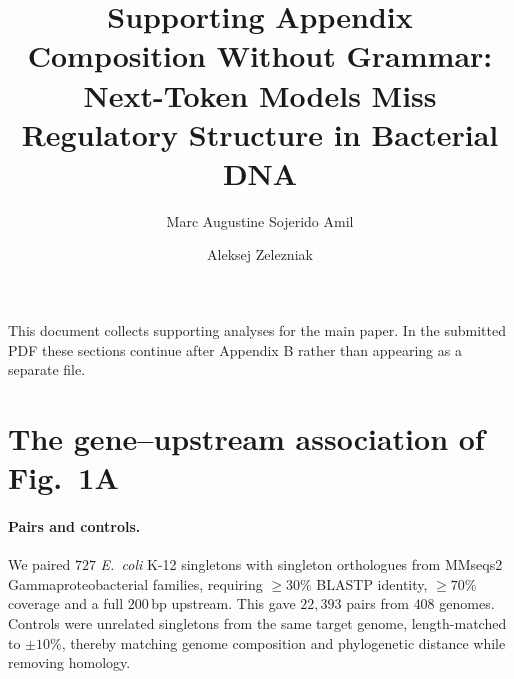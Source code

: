 \documentclass{article}
\title{Supporting Appendix\\[0.4em]
\large Composition Without Grammar: Next-Token Models Miss Regulatory
Structure in Bacterial DNA}
\author{Marc Augustine Sojerido Amil \and Aleksej Zelezniak}
\numberwithin{figure}{section}
\numberwithin{table}{section}
\numberwithin{equation}{section}
\begin{document}
\maketitle

This document collects supporting analyses for the main paper. In the submitted
PDF these sections continue after Appendix B rather than appearing as a separate
file.
\fi

\providecommand{\rev}[1]{\begingroup\color{red}#1\endgroup}

\section{The gene--upstream association of Fig.~1A}
\label{app:fig1a}

\paragraph{Pairs and controls.} We paired $727$ \emph{E.~coli} K-12 singletons
with singleton orthologues from MMseqs2 Gammaproteobacterial families, requiring
$\ge30\%$ BLASTP identity, $\ge70\%$ coverage and a full $200$\,bp upstream. This
gave $22{,}393$ pairs from $408$ genomes. Controls were unrelated singletons from
the same target genome, length-matched to $\pm10\%$, thereby matching genome
composition and phylogenetic distance while removing homology.
\end{document}
